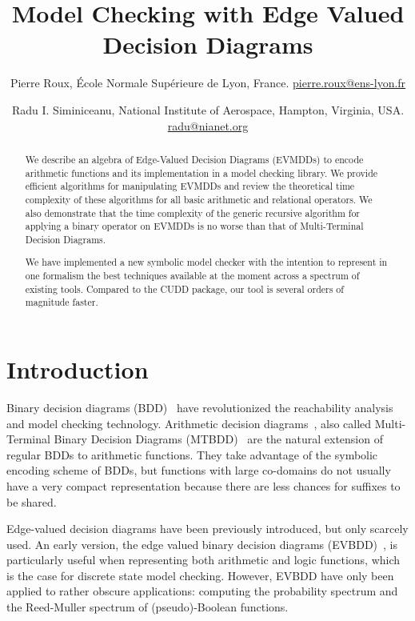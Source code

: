 \documentclass[a4paper]{easychair}
\title{Model Checking with Edge Valued Decision Diagrams}
\author{Pierre Roux, 
\'{E}cole Normale Sup\'{e}rieure de Lyon, France.
\url{pierre.roux@ens-lyon.fr}
\and
Radu I. Siminiceanu, 
National Institute of Aerospace, Hampton, Virginia, USA.
\url{radu@nianet.org}
}
\begin{document}

\maketitle

\thispagestyle{empty}

\begin{abstract}
We describe an algebra of Edge-Valued Decision Diagrams (EVMDDs) to 
encode arithmetic functions and its implementation in a model checking 
library.
%
We provide efficient algorithms for manipulating EVMDDs and review
the theoretical time complexity of these algorithms for all basic 
arithmetic and relational operators. We also demonstrate that the time 
complexity of the generic recursive algorithm for applying a binary 
operator on EVMDDs is no worse than that of Multi-Terminal Decision 
Diagrams.

We have implemented a new symbolic model checker with the intention to 
represent in one formalism the best techniques available at the moment 
across a spectrum of existing tools.
Compared to the CUDD package, our tool is several orders of magnitude faster.


\end{abstract}

\section{Introduction}

Binary decision diagrams (BDD)~\cite{Bryant1986} have 
revolutionized the reachability analysis and model checking technology. 
% 
Arithmetic decision diagrams~\cite{Somenzi1993}, also called Multi-Terminal
Binary Decision Diagrams (MTBDD)~\cite{Clarke1995} are the 
natural extension of regular BDDs to arithmetic functions. They take 
advantage of the symbolic encoding scheme of BDDs, but functions with 
large co-domains do not usually have a very compact representation 
because there are less chances for suffixes to be shared.

Edge-valued decision diagrams have been previously 
introduced, but only scarcely used. An early version, the edge valued binary 
decision diagrams (EVBDD)~\cite{Lai1992}, is particularly useful 
when representing both arithmetic and logic functions, which is the case 
for discrete state model checking. However, EVBDD have only been applied 
to rather obscure applications: computing the probability spectrum and 
the Reed-Muller spectrum of (pseudo)-Boolean functions. 
\end{document}
